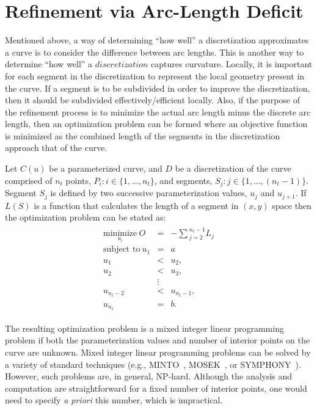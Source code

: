 \section{Refinement via Arc-Length Deficit}
Mentioned above, a way of determining ``how well'' a discretization 
approximates a curve is to consider the difference between arc lengths. 
This is another way to determine ``how well'' a $discretization$ captures curvature. Locally, it is important for each segment in the discretization to represent the local geometry present in the curve. If a segment is to be subdivided in order to improve the discretization, then it should be subdivided 
effectively/efficient locally.
Also, if the purpose of the refinement process is to minimize the actual arc length minus the discrete arc length, then an optimization problem can be formed where an objective function is minimized as the combined length of the segments in the discretization approach that of the curve.

Let $C(u)$ be a parameterized curve, and $D$ be a discretization of the 
curve comprised of $n_t$ points, $P_i : i \in \{1,...,n_t\}$, and 
segments, $S_j : j \in \{1,...,(n_t-1)\}$. Segment $S_j$ is defined by two successive parameterization values, $u_j$ and $u_{j+1}$. If $L(S)$ is a function that calculates the length of a segment in $(x,y)$ space then the optimization problem can be stated as:
\begin{eqnarray*}
\begin{array}{rcl}
\underset{u_i}{\text{minimize}} \ O & = & -\sum{_{j=2}^{n_t-1}L_j} \\
\text{subject to} \ u_1 & = & a \\
u_1 & < & u_2, \\ 
u_2 & < & u_3, \\
& \vdots & \\
u_{n_t-2} & < & u_{n_t-1},\\ 
u_{n_t} & = & b.
\end{array}
\end{eqnarray*}

The resulting optimization problem is a mixed integer linear programming 
problem if both the parameterization values and number of interior points 
on the curve are unknown.  Mixed integer linear programming problems can 
be solved by a variety of standard techniques (e.g., MINTO~\cite{minto}, 
MOSEK~\cite{mosek}, or SYMPHONY~\cite{symphony}).  However, such problems 
are, in general, NP-hard.  
Although the analysis and computation are straightforward for a fixed 
number of interior points, one would need to specify {\it{a priori}} this 
number, which is impractical.


